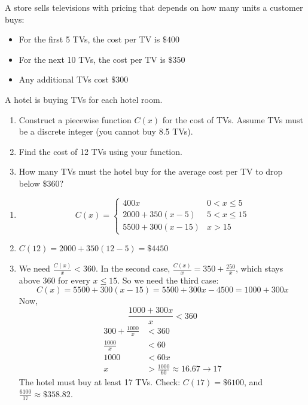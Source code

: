 \begin{Exercise}[title={More TVs is Better}, label={ex:tvs}]

A store sells televisions with pricing that depends on how many units a customer buys:
\begin{itemize}
  \item For the first 5 TVs, the cost per TV is $\mathdollar400$
  \item For the next 10 TVs, the cost per TV is $\mathdollar350$
  \item Any additional TVs cost $\mathdollar 300$
\end{itemize}

A hotel is buying TVs for each hotel room.
\begin{enumerate}
  \item Construct a piecewise function $C(x)$ for the cost of TVs. Assume TVs must be a discrete integer (you cannot buy 8.5 TVs).
  \item Find the cost of 12 TVs using your function.
  \item How many TVs must the hotel buy for the average cost per TV to drop
        below $\mathdollar360$?
\end{enumerate}
\end{Exercise}
\begin{Answer}[ref={ex:tvs}]

\begin{enumerate}
  \item $$C(x) =
\begin{cases}
400x & 0 < x \le 5 \\
2000 + 350(x - 5) & 5 < x \le 15 \\
5500 + 300(x - 15) & x > 15
\end{cases}$$
\item $C(12) = 2000 + 350(12 - 5) = \mathdollar4450$
\item We need $\frac{C(x)}{x} < 360$. In the second case,
$\frac{C(x)}{x} = 350 + \frac{250}{x}$, which stays above 360 for every
$x \le 15$. So we need the third case:
$$C(x) = 5500 + 300(x - 15) = 5500 + 300x - 4500 = 1000 + 300x$$ 
Now, 
$$\frac{1000 + 300x}{x} < 360$$
\begin{align*}
  300 + \frac{1000}{x} &< 360\\
  \frac{1000}{x} &< 60 \\ 
  1000 &< 60x\\
  x &> \frac{1000}{60} \approx 16.67 \rightarrow 17
\end{align*}
The hotel must buy at least 17 TVs. Check: $C(17) = \mathdollar6100$, and
$\frac{6100}{17} \approx \mathdollar358.82$.
\end{enumerate}

\end{Answer}

